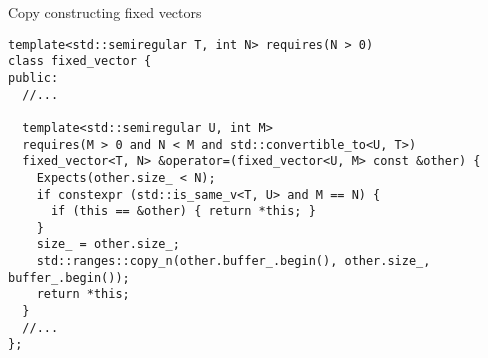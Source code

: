 \begin{frame}[t,fragile]
\begin{block}{Copy constructing fixed vectors}
\begin{lstlisting}
template<std::semiregular T, int N> requires(N > 0)
class fixed_vector {
public:
  //...

  template<std::semiregular U, int M>
  requires(M > 0 and N < M and std::convertible_to<U, T>)
  fixed_vector<T, N> &operator=(fixed_vector<U, M> const &other) {
    Expects(other.size_ < N);
    if constexpr (std::is_same_v<T, U> and M == N) {
      if (this == &other) { return *this; }
    }
    size_ = other.size_;
    std::ranges::copy_n(other.buffer_.begin(), other.size_, buffer_.begin());
    return *this;
  }
  //...
};
\end{lstlisting}
\end{block}
\end{frame}
